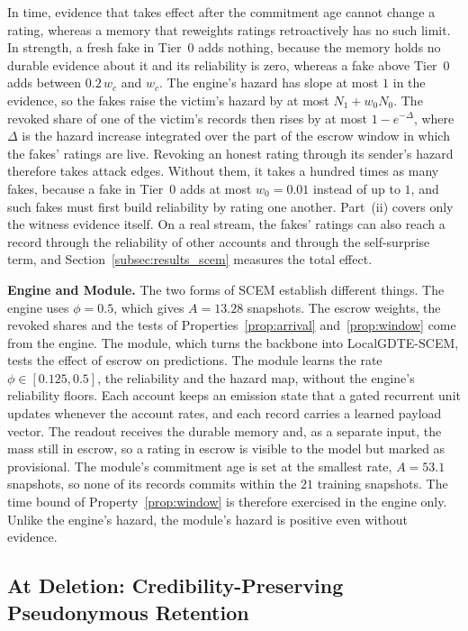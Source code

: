 \documentclass[lettersize,journal]{IEEEtran}
\begin{document}
In time, evidence that takes effect after the commitment age cannot change a rating, whereas a memory that reweights ratings retroactively has no such limit.
In strength, a fresh fake in Tier~$0$ adds nothing, because the memory holds no durable evidence about it and its reliability is zero, whereas a fake above Tier~$0$ adds between $0.2\,w_c$ and $w_c$.
The engine's hazard has slope at most $1$ in the evidence, so the fakes raise the victim's hazard by at most $N_1 + w_0 N_0$. The revoked share of one of the victim's records then rises by at most $1 - e^{-\Delta}$, where $\Delta$ is the hazard increase integrated over the part of the escrow window in which the fakes' ratings are live.
Revoking an honest rating through its sender's hazard therefore takes attack edges. Without them, it takes a hundred times as many fakes, because a fake in Tier~$0$ adds at most $w_0 = 0.01$ instead of up to $1$, and such fakes must first build reliability by rating one another.
Part~(ii) covers only the witness evidence itself.
On a real stream, the fakes' ratings can also reach a record through the reliability of other accounts and through the self-surprise term, and Section~\ref{subsec:results_scem} measures the total effect.

\smallskip\noindent\textbf{Engine and Module.}
The two forms of SCEM establish different things.
The engine uses $\phi = 0.5$, which gives $A = 13.28$ snapshots. The escrow weights, the revoked shares and the tests of Properties~\ref{prop:arrival} and~\ref{prop:window} come from the engine.
The module, which turns the backbone into LocalGDTE-SCEM, tests the effect of escrow on predictions.
The module learns the rate $\phi \in [0.125, 0.5]$, the reliability and the hazard map, without the engine's reliability floors.
Each account keeps an emission state that a gated recurrent unit updates whenever the account rates, and each record carries a learned payload vector.
The readout receives the durable memory and, as a separate input, the mass still in escrow, so a rating in escrow is visible to the model but marked as provisional.
The module's commitment age is set at the smallest rate, $A = 53.1$ snapshots, so none of its records commits within the $21$ training snapshots. The time bound of Property~\ref{prop:window} is therefore exercised in the engine only. Unlike the engine's hazard, the module's hazard is positive even without evidence.

\subsection{At Deletion: Credibility-Preserving Pseudonymous Retention}
\label{sec:cppr}
\end{document}
